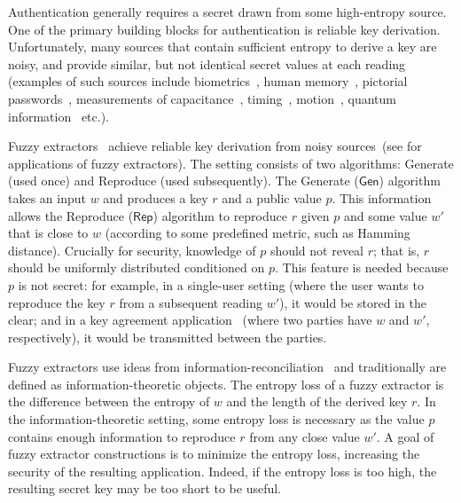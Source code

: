 \documentclass[11pt]{article}
\newcommand{\class}[1]{{\ensuremath{\mathsf{#1}}}}
\newcommand{\gen}{\ensuremath{\class{Gen}}\xspace}
\newcommand{\rep}{\ensuremath{\class{Rep}}\xspace}
\begin{document}
Authentication generally requires a secret drawn from some high-entropy source.  One of the primary building blocks for authentication is reliable key derivation.  Unfortunately, many sources that contain sufficient entropy to derive a key are  noisy, and provide similar, but not identical secret values at each reading (examples of such sources include biometrics~\cite{daugman2004}, human memory~\cite{zviran1993comparison}, pictorial passwords~\cite{brostoff2000passfaces}, measurements of capacitance~\cite{tuyls2006puf}, timing~\cite{suh2007physical}, motion~\cite{castelluccia2005shake},  quantum information~\cite{bennett1988privacy} etc.).  %

Fuzzy extractors~\cite{DBLP:journals/siamcomp/DodisORS08} achieve reliable key derivation from noisy sources~(see \cite{Boyen05secureremote,dodisWichs2009,chandran2010privacy} for applications of fuzzy extractors).  The setting 
consists of  two algorithms: Generate (used once) and Reproduce (used subsequently).  The Generate ($\gen$) algorithm takes an input $w$ and produces a key $r$ and a public value $p$.  This information allows
the Reproduce ($\rep$) algorithm to reproduce $r$ given $p$ and some value $w'$ that is close to $w$ (according to some predefined metric, such as Hamming distance). 
Crucially for security,  knowledge of $p$ should not reveal $r$; that is, $r$ should be uniformly distributed conditioned on $p$.  This feature is needed because $p$ is not secret: for example, in a single-user setting (where the user wants to reproduce the key $r$ from a subsequent reading $w'$), it would be stored in the clear; and in a key agreement application~\cite{Boyen05secureremote} (where two parties have $w$ and $w'$, respectively), it would be transmitted between the parties.

Fuzzy extractors use ideas from information-reconciliation~\cite{bennett1988privacy} and traditionally are defined as information-theoretic objects.  The entropy loss of a fuzzy extractor is the difference between the entropy of $w$ and the length of the derived key $r$.  In the information-theoretic setting, some entropy loss is necessary as the value $p$ contains enough information to reproduce $r$ from any close value $w'$. 
A goal of fuzzy extractor constructions is to minimize the entropy loss, increasing the security of the resulting application.  Indeed, if the entropy loss is too high, the resulting secret key may be too short to be useful. 
\end{document}
